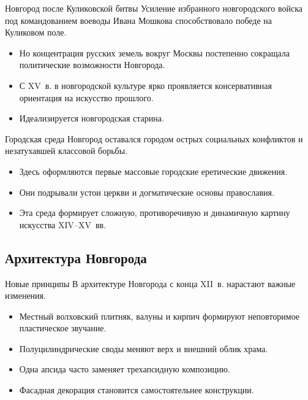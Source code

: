 \begin{frame}{Новгород после Куликовской битвы}
  Усиление избранного новгородского войска под командованием воеводы
  Ивана Мошкова способствовало победе на Куликовом поле.

  \begin{itemize}
    \item Но концентрация русских земель вокруг Москвы постепенно
          сокращала политические возможности Новгорода.
    \item С XV~в. в новгородской культуре ярко проявляется
          консервативная ориентация на искусство прошлого.
    \item Идеализируется новгородская старина.
  \end{itemize}
\end{frame}

\begin{frame}{Городская среда}
  Новгород оставался городом острых социальных конфликтов
  и незатухавшей классовой борьбы.

  \begin{itemize}
    \item Здесь оформляются первые массовые городские еретические
          движения.
    \item Они подрывали устои церкви и догматические основы православия.
    \item Эта среда формирует сложную, противоречивую и динамичную
          картину искусства XIV--XV~вв.
  \end{itemize}
\end{frame}

\subsection{Архитектура Новгорода}

\begin{frame}{Новые принципы}
  В архитектуре Новгорода с конца XII~в. нарастают важные изменения.

  \begin{itemize}
    \item Местный волховский плитняк, валуны и кирпич формируют
          неповторимое пластическое звучание.
    \item Полуцилиндрические своды меняют верх и внешний облик храма.
    \item Одна апсида часто заменяет трехапсидную композицию.
    \item Фасадная декорация становится самостоятельнее конструкции.
  \end{itemize}
\end{frame}


